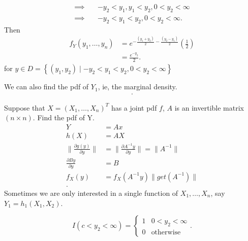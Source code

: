 \begin{example}
\begin{enumerate}
\begin{align*}
				\implies \quad& -y_2 < y_1  , y_1 < y_2 , 0 < y_2  < \infty \\
				\implies \quad& -y_2 < y_1 < y_2, 0 < y_2 < \infty
			.\end{align*}
		Then
		\begin{align*}
			f_{Y}\left( y_{1} , \ldots , y_{n} \right)  &= e^{-\frac{\left( y_1 + y_2  \right)}{2} - \frac{\left( y_2 - y_1 \right) }{2} } \left( \frac{1}{2} \right) \\
			&= \frac{e ^{-y_2}}{2} 
		.\end{align*}
		for $y \in D = \left\{ \left( y_1, y_2  \right)  \mid -y_2 < y_1 < y_2, 0 < y_2 < \infty \right\} $
	\end{enumerate}
	We can also find the pdf of $Y_1$, ie, the marginal density. 
	\begin{align*}
		
	.\end{align*}
\end{example}

\begin{example}
	Suppose that $X = \left( X_{1} , \ldots , X_{n} \right) ^{T}$ has a joint pdf $f$, $A$ is an invertible matrix $\left( n \times  n \right) $. Find the pdf of Y. 
	\begin{align*}
		Y &= Ax \\
		h\left( X \right)  &=  AX \\
		\|\frac{\partial g\left( y \right) }{\partial y} \| &= \|\frac{\partial A^{-1}y}{\partial y}\| = \|A^{-1}\|  \\
		\frac{\partial By}{\partial y} &= B \\
		f_X\left( y \right) &= f_{X} \left( A^{-1}y \right) \|get\left( A^{-1} \right) \|\\
	.\end{align*}
	Sometimes we are only interested in a  single function of $X_{1} , \ldots , X_{n}$, say $Y_1 = h_1\left( X_1, X_2 \right) $. 
	\begin{note}
		\[
			I\left( c < y_2 < \infty \right) = \begin{cases}
				1 & 0 < y_2 < \infty\\
				0 & \text{otherwise}
			\end{cases}
		.\] 
	\end{note}

\end{example}
 
